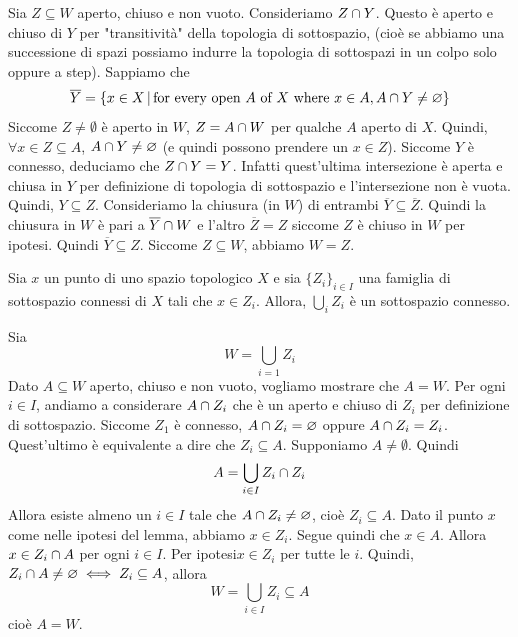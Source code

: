 \documentclass[a4paper]{article}
\begin{document}
\begin{snippetproof}{}
    Sia \(Z \subseteq W\) aperto, chiuso e non vuoto.
    Consideriamo \(Z \cap Y\).
    Questo è aperto e chiuso di \(Y\) per
    "transitività" della topologia di sottospazio,
    (cioè se abbiamo una successione di spazi possiamo indurre la topologia di sottospazi in un colpo solo oppure a step).
    Sappiamo che
    \[
        \overline{Y} = \{x \in X \,|\, \text{for every open } A \text{ of } X \text{ where } x \in A, A \cap Y \neq \varnothing\}
    \]
    Siccome \(Z \neq \emptyset\) è aperto in \(W\),
    \(Z = A \cap W\) per qualche \(A\) aperto di \(X\).
    Quindi, \(\forall x \in Z \subseteq A\), \(A \cap Y \neq \varnothing\)
    (e quindi possono prendere un \(x\in Z\)).
    Siccome \(Y\) è connesso,
    deduciamo che \(Z \cap Y = Y\).
    Infatti quest'ultima intersezione è aperta e chiusa in \(Y\) per definizione di
    topologia di sottospazio e l'intersezione non è vuota.
    Quindi, \(Y \subseteq Z\). Consideriamo la chiusura (in \(W\)) di entrambi
    \(\overline{Y} \subseteq \overline{Z}\).
    Quindi la chiusura in \(W\) è pari a \(\overline{Y} \cap W\)
    e l'altro \(\overline{Z}=Z\) siccome \(Z\) è chiuso in \(W\) per ipotesi.
    Quindi \(\overline{Y} \subseteq Z\).
    Siccome \(Z \subseteq W\), abbiamo \(W=Z\).
\end{snippetproof}

\begin{snippetlemma}{}
    Sia \(x\) un punto di uno spazio topologico \(X\)
    e sia \(\{Z_i\}_{i\in I}\) una famiglia di sottospazio connessi di \(X\)
    tali che \(x\in Z_i\).
    Allora, \(\bigcup_i Z_i\) è un sottospazio connesso.
\end{snippetlemma}

\begin{snippetproof}{}
    Sia
    \[
        W = \bigcup_{i=1} Z_i
    \]
    Dato \(A \subseteq W\) aperto, chiuso e non vuoto,
    vogliamo mostrare che \(A=W\).
    Per ogni \(i \in I\), andiamo a considerare
    \(A \cap Z_i\) che è un aperto e chiuso di \(Z_i\)
    per definizione di sottospazio.
    Siccome \(Z_1\) è connesso, \(A \cap Z_i = \varnothing\)
    oppure \(A \cap Z_i = Z_i\).
    Quest'ultimo è equivalente a dire che \(Z_i \subseteq A\).
    Supponiamo \(A \neq \emptyset\). Quindi
    \[
        A = \bigcup_{i\in I} Z_i \cap Z_i
    \]
    Allora esiste almeno un \(i \in I\) tale che \(A \cap Z_i \neq \varnothing\),
    cioè \(Z_i \subseteq A\).
    Dato il punto \(x\) come nelle ipotesi del lemma,
    abbiamo \(x \in Z_i\).
    Segue quindi che \(x \in A\).
    Allora \(x \in Z_i \cap A\) per ogni \(i \in I\).
    Per ipotesi\(x\in Z_i\) per tutte le \(i\).
    Quindi, \(Z_i \cap A \neq \varnothing \iff Z_i \subseteq A\), allora
    \[
        W = \bigcup_{i\in I} Z_i \subseteq A
    \]
    cioè \(A = W\).
\end{snippetproof}
\end{document}
